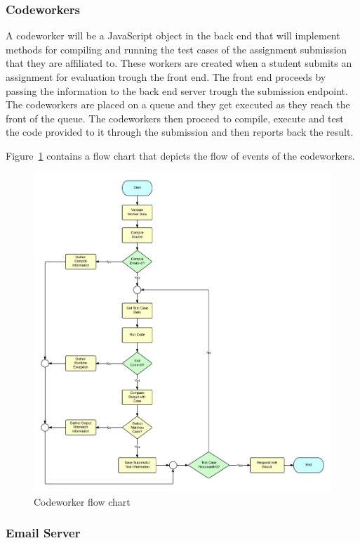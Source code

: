 \subsubsection{Codeworkers}

A codeworker will be a JavaScript object in the back end that will implement
methods for compiling and running the test cases of the assignment submission
that they are affiliated to. These workers are created when a student submits an
assignment for evaluation trough the front end. The front end proceeds by
passing the information to the back end server trough the submission endpoint.
The codeworkers are placed on a queue and they get executed as they reach the
front of the queue. The codeworkers then proceed to compile, execute and test
the code provided to it through the submission and then reports back the
result.

Figure~\ref{fig:flow} contains a flow chart that depicts the flow of events of
the codeworkers.

\begin{figure}[H]
	\centering
	\includegraphics[width=\textwidth]{img/flowchart}
	\caption{Codeworker flow chart\label{fig:flow}}
\end{figure}

\subsubsection{Email Server}

